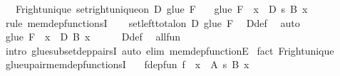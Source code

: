 \begin{isabellebody}
\ \ \ F{\isacharunderscore}{\kern0pt}right{\isacharunderscore}{\kern0pt}unique{\isacharcolon}{\kern0pt}\ {\isachardoublequoteopen}set{\isacharunderscore}{\kern0pt}right{\isacharunderscore}{\kern0pt}unique{\isacharunderscore}{\kern0pt}on\ D\ {\isacharparenleft}{\kern0pt}glue\ F{\isacharparenright}{\kern0pt}{\isachardoublequoteclose}\isanewline
\ \ \ {\isachardoublequoteopen}glue\ F\ {\isasymin}\ {\isacharparenleft}{\kern0pt}x\ {\isasymin}\ D{\isacharparenright}{\kern0pt}\ {\isasymrightarrow}s\ B\ x{\isachardoublequoteclose}\isanewline
%
\isadelimproof
%
\endisadelimproof
%
\isatagproof
{}\isamarkupfalse%
\ {\isacharparenleft}{\kern0pt}rule\ mem{\isacharunderscore}{\kern0pt}dep{\isacharunderscore}{\kern0pt}functionsI{\isacharparenright}{\kern0pt}\isanewline
\ \ \isamarkupfalse%
\ {\isachardoublequoteopen}set{\isacharunderscore}{\kern0pt}left{\isacharunderscore}{\kern0pt}total{\isacharunderscore}{\kern0pt}on\ D\ {\isacharparenleft}{\kern0pt}glue\ F{\isacharparenright}{\kern0pt}{\isachardoublequoteclose}\ \isamarkupfalse%
\ D{\isacharunderscore}{\kern0pt}def\ \isamarkupfalse%
\ auto\isanewline
\ \ \isamarkupfalse%
\ {\isachardoublequoteopen}glue\ F\ {\isasymsubseteq}\ {\isasymSum}x\ {\isasymin}\ D{\isachardot}{\kern0pt}\ {\isacharparenleft}{\kern0pt}B\ x{\isacharparenright}{\kern0pt}{\isachardoublequoteclose}\isanewline
\ \ \ \ \isamarkupfalse%
\ D{\isacharunderscore}{\kern0pt}def\ \isamarkupfalse%
\ all{\isacharunderscore}{\kern0pt}fun\isanewline
\ \ \ \ \isamarkupfalse%
\ {\isacharparenleft}{\kern0pt}intro\ glue{\isacharunderscore}{\kern0pt}subset{\isacharunderscore}{\kern0pt}dep{\isacharunderscore}{\kern0pt}pairsI{\isacharparenright}{\kern0pt}\ {\isacharparenleft}{\kern0pt}auto\ elim{\isacharbang}{\kern0pt}{\isacharcolon}{\kern0pt}\ mem{\isacharunderscore}{\kern0pt}dep{\isacharunderscore}{\kern0pt}functionE{\isacharparenright}{\kern0pt}\isanewline
{}\isamarkupfalse%
\ {\isacharparenleft}{\kern0pt}fact\ F{\isacharunderscore}{\kern0pt}right{\isacharunderscore}{\kern0pt}unique{\isacharparenright}{\kern0pt}%
\endisatagproof
{\isafoldproof}%
%
\isadelimproof
\isanewline
%
\endisadelimproof
\isanewline
{}\isamarkupfalse%
\ glue{\isacharunderscore}{\kern0pt}upair{\isacharunderscore}{\kern0pt}mem{\isacharunderscore}{\kern0pt}dep{\isacharunderscore}{\kern0pt}functionsI{\isacharcolon}{\kern0pt}\isanewline
\ \ \ f{\isacharunderscore}{\kern0pt}dep{\isacharunderscore}{\kern0pt}fun{\isacharcolon}{\kern0pt}\ {\isachardoublequoteopen}f\ {\isasymin}\ {\isacharparenleft}{\kern0pt}x\ {\isasymin}\ A{\isacharparenright}{\kern0pt}\ {\isasymrightarrow}s\ B\ x{\isachardoublequoteclose}\isanewline

\end{isabellebody}
